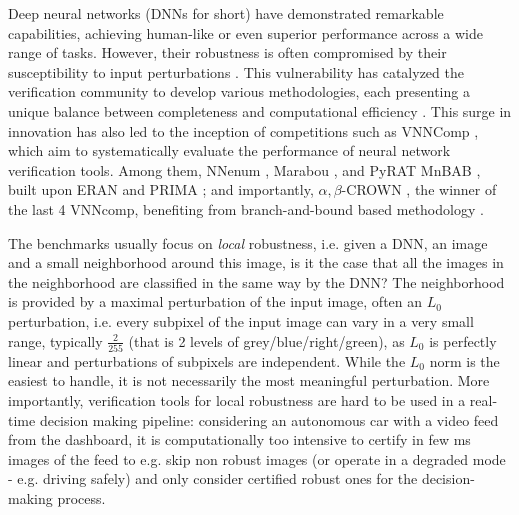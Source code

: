 Deep neural networks (DNNs for short) have demonstrated remarkable capabilities, achieving human-like or even superior performance across a wide range of tasks. However, their robustness is often compromised by their susceptibility to input perturbations \cite{szegedy}. This vulnerability has catalyzed the verification community to develop various methodologies, each presenting a unique balance between completeness and computational efficiency \cite{Marabou,Reluplex,deeppoly}. This surge in innovation has also led to the inception of competitions such as VNNComp \cite{VNNcomp}, which aim to systematically evaluate the performance of neural network verification tools. Among them, NNenum \cite{nnenum}, Marabou \cite{Marabou,Marabou2}, and PyRAT \cite{pyrat} MnBAB \cite{ferrari2022complete}, built upon ERAN \cite{deeppoly} and PRIMA \cite{prima}; and importantly, $\alpha,\beta$-CROWN \cite{crown,xu2020fast}, the winner of the last 4 VNNcomp, benefiting from branch-and-bound based methodology \cite{cutting,BaB}.

The benchmarks usually focus on {\em local} robustness, i.e. given a DNN, an image and a small neighborhood around this image, is it the case that all the images in the neighborhood are classified in the same way by the DNN? The neighborhood is provided by a maximal perturbation of the input image, often an $L_0$ perturbation, i.e. every subpixel of the input image can vary in a very small range, typically 
$\frac{2}{255}$ (that is 2 levels of grey/blue/right/green), as $L_0$ is perfectly linear and perturbations of subpixels are independent. While the $L_0$ norm is the easiest to handle, it is not necessarily the most meaningful perturbation.
More importantly, verification tools for local robustness are hard to be used in a real-time decision making pipeline: considering an autonomous car with a video feed from the dashboard, it is computationally too intensive to certify in few ms images of the feed to e.g. skip non robust images (or operate in a degraded mode - e.g. driving safely) and only consider certified robust ones for the decision-making process.

\smallskip

